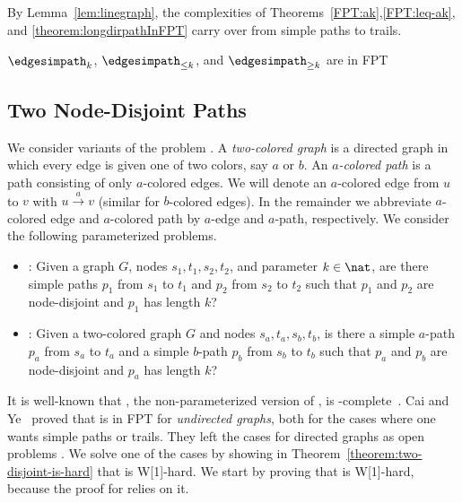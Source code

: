 \documentclass[a4paper,english]{lipics-v2016}
\theoremstyle{plain}
\begin{document}
By Lemma~\ref{lem:linegraph}, the complexities of
Theorems~\ref{FPT:ak},\ref{FPT:leq-ak}, and
\ref{theorem:longdirpathInFPT} carry over from simple paths to trails.
\begin{theorem}
	$\edgesimpath_k$,  $\edgesimpath_{\leq k}$, and $\edgesimpath_{\geq k}$ are in FPT
\end{theorem}

\subsection{Two Node-Disjoint Paths}\label{sec:twodisjointpaths}

We consider variants of the \twodisjointpaths problem \cite{FortuneHW-TCS80}. A \emph{two-colored graph} is a directed graph in which every
edge is given one of two colors, say $a$ or $b$. An \emph{$a$-colored
  path} is a path consisting of only $a$-colored edges. We will denote an
$a$-colored edge from $u$ to $v$ with $u \stackrel{a}{\to} v$ (similar
for $b$-colored edges). In the remainder we abbreviate
$a$-colored edge and $a$-colored path by $a$-edge and $a$-path, respectively.
We consider the following parameterized problems.
\begin{itemize}
\item \knodedisjointpaths: Given a graph $G$, nodes $s_1,t_1,s_2,t_2$,
  and parameter $k \in \nat$, are there simple paths
  $p_1$ from $s_1$ to $t_1$ and $p_2$ from $s_2$ to $t_2$ such that
  $p_1$ and $p_2$ are node-disjoint and $p_1$ has length $k$?
\item \knodecolordisjointpaths: Given a two-colored graph $G$ and nodes $s_a,t_a,s_b,t_b$,
  is there a simple $a$-path $p_a$ from $s_a$ to $t_a$ and
  a simple $b$-path $p_b$ from $s_b$ to $t_b$ such that $p_a$
  and $p_b$ are node-disjoint and $p_a$ has length $k$?
\end{itemize}
It is well-known that \twodisjointpaths, the non-parameterized version
of \knodedisjointpaths, is \np-complete~\cite{FortuneHW-TCS80}.
Cai and Ye~\cite{CaiWG-16}
proved that \knodedisjointpaths is in FPT for \emph{undirected
  graphs}, both for the cases where one wants simple paths or
trails. They left the cases for directed graphs as open
problems \cite[Problem 2]{CaiWG-16}. We solve one of the cases by
showing in Theorem~\ref{theorem:two-disjoint-is-hard} that \knodedisjointpaths is W[1]-hard. We start
by proving that \knodecolordisjointpaths is W[1]-hard, because the proof
for \knodedisjointpaths relies on it. 
\end{document}
